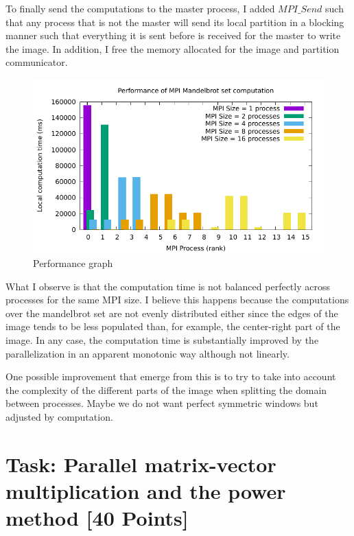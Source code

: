 \documentclass[unicode,11pt,a4paper,oneside,numbers=endperiod,openany]{scrartcl}
\begin{document}
To finally send the computations to the master process, I added $MPI\_Send$ such that any process that is not the master will send its local partition in a blocking manner such 
that everything it is sent before is received for the master to write the image. In addition, I free the memory allocated for the image and partition communicator.

\begin{figure}[H]
    \centering
    \includegraphics[width=\textwidth]{./img/exe3/perf.pdf}
    \caption{Performance graph}
  \end{figure}

What I observe is that the computation time is not balanced perfectly across processes for the same MPI size. I believe this happens because the computations over the mandelbrot set are not evenly distributed either
since the edges of the image tends to be less populated than, for example, the center-right part of the image. In any case, the computation time  is substantially improved by the parallelization in an apparent monotonic way although
not linearly. 

One possible improvement that emerge from this is to try to take into account the complexity of the different parts of the image when splitting the domain between processes.
Maybe we do not want perfect symmetric windows but adjusted by computation. 


\section{Task: Parallel matrix-vector multiplication and the power method [40 Points]}
\end{document}
